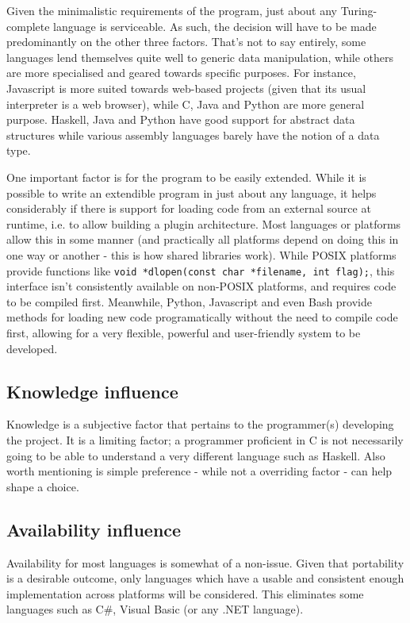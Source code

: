 \documentclass[10pt,a4paper,notitlepage]{report}
\begin{document}
Given the minimalistic requirements of the program, just about any Turing-complete language is serviceable. As such, the decision will have to be made predominantly on the other three factors. That's not to say entirely, some languages lend themselves quite well to generic data manipulation, while others are more specialised and geared towards specific purposes. For instance, Javascript is more suited towards web-based projects (given that its usual interpreter is a web browser), while C, Java and Python are more general purpose. Haskell, Java and Python have good support for abstract data structures while various assembly languages barely have the notion of a data type.

One important factor is for the program to be easily extended. While it is possible to write an extendible program in just about any language, it helps considerably if there is support for loading code from an external source at runtime, i.e. to allow building a plugin architecture.
Most languages or platforms allow this in some manner (and practically all platforms depend on doing this in one way or another - this is how shared libraries work). While POSIX platforms provide functions like \lstinline$void *dlopen(const char *filename, int flag);$, this interface isn't consistently available on non-POSIX platforms, and requires code to be compiled first. Meanwhile, Python, Javascript and even Bash provide methods for loading new code programatically without the need to compile code first, allowing for a very flexible, powerful and user-friendly system to be developed.

\subsection{Knowledge influence}
Knowledge is a subjective factor that pertains to the programmer(s) developing the project. It is a limiting factor; a programmer proficient in C is not necessarily going to be able to understand a very different language such as Haskell. Also worth mentioning is simple preference - while not a overriding factor - can help shape a choice.

\subsection{Availability influence}
Availability for most languages is somewhat of a non-issue. Given that portability is a desirable outcome, only languages which have a usable and consistent enough implementation across platforms will be considered. This eliminates some languages such as C\#, Visual Basic (or any .NET language).
\end{document}
